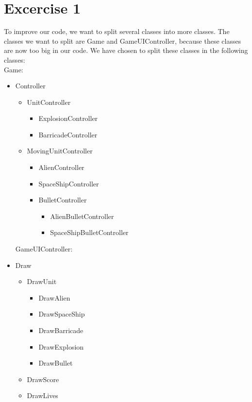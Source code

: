 \documentclass[10pt]{article}
\begin{document}
\section*{Excercise 1}
To improve our code, we want to split several classes into more classes. The classes we want to split are Game and GameUIController, because these classes are now too big in our code. We have chosen to split these classes in the following classes:\\
Game:
\begin{itemize}
\item Controller
\begin{itemize}
\item UnitController
\begin{itemize}
\item ExplosionController
\item BarricadeController	
\end{itemize}
\item MovingUnitController
\begin{itemize}
\item AlienController
\item SpaceShipController
\item BulletController
\begin{itemize}
\item AlienBulletController
\item SpaceShipBulletController
\end{itemize}
\end{itemize}
\end{itemize}
GameUIController:
\item Draw
\begin{itemize}
\item DrawUnit
\begin{itemize}
\item DrawAlien
\item DrawSpaceShip
\item DrawBarricade
\item DrawExplosion
\item DrawBullet
\end{itemize}
\item DrawScore
\item DrawLives
\end{itemize}
\end{itemize}
\end{document}
